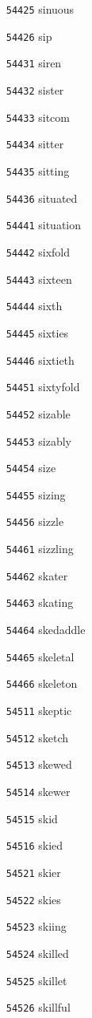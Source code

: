 \documentclass[twoside,11pt]{article}
\begin{document}
\begin{multicols}{5}
\begin{enumerate}
\item[\texttt{54425}] sinuous
\item[\texttt{54426}] sip
\item[\texttt{54431}] siren
\item[\texttt{54432}] sister
\item[\texttt{54433}] sitcom
\item[\texttt{54434}] sitter
\item[\texttt{54435}] sitting
\item[\texttt{54436}] situated
\item[\texttt{54441}] situation
\item[\texttt{54442}] sixfold
\item[\texttt{54443}] sixteen
\item[\texttt{54444}] sixth
\item[\texttt{54445}] sixties
\item[\texttt{54446}] sixtieth
\item[\texttt{54451}] sixtyfold
\item[\texttt{54452}] sizable
\item[\texttt{54453}] sizably
\item[\texttt{54454}] size
\item[\texttt{54455}] sizing
\item[\texttt{54456}] sizzle
\item[\texttt{54461}] sizzling
\item[\texttt{54462}] skater
\item[\texttt{54463}] skating
\item[\texttt{54464}] skedaddle
\item[\texttt{54465}] skeletal
\item[\texttt{54466}] skeleton
\item[\texttt{54511}] skeptic
\item[\texttt{54512}] sketch
\item[\texttt{54513}] skewed
\item[\texttt{54514}] skewer
\item[\texttt{54515}] skid
\item[\texttt{54516}] skied
\item[\texttt{54521}] skier
\item[\texttt{54522}] skies
\item[\texttt{54523}] skiing
\item[\texttt{54524}] skilled
\item[\texttt{54525}] skillet
\item[\texttt{54526}] skillful

\end{enumerate}
\end{multicols}
\end{document}
